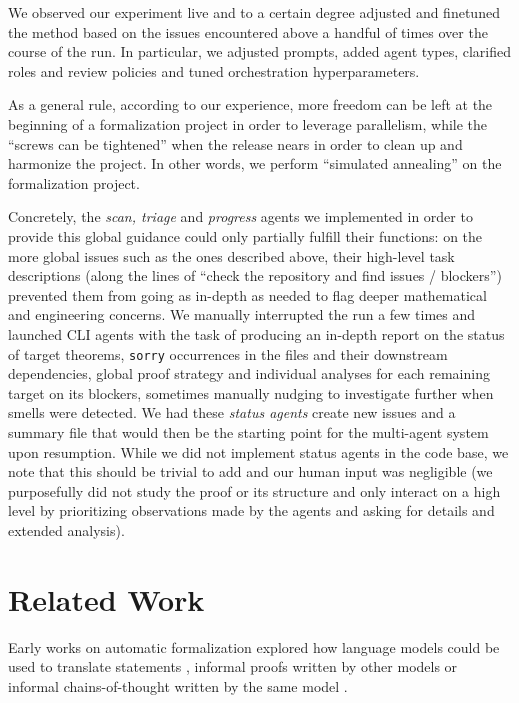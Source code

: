 \documentclass[]{fairmeta}
\begin{document}
We observed our experiment live and to a certain degree adjusted and finetuned the method based on the issues encountered above a handful of times over the course of the run. In particular, we adjusted prompts,  added agent types, clarified roles and review policies and tuned orchestration hyperparameters.

As a general rule, according to our experience, more freedom can be left at the beginning of a formalization project in order to leverage parallelism, while the ``screws can be tightened'' when the release nears in order to clean up and harmonize the project. In other words, we perform ``simulated annealing'' on the formalization project. 

Concretely, the \emph{scan, triage} and \emph{progress} agents we implemented in order to provide this global guidance could only partially fulfill their functions: on the more global issues such as the ones described above, their high-level task descriptions (along the lines of ``check the repository and find issues / blockers'') prevented them from going as in-depth as needed to flag deeper mathematical and engineering concerns. We manually interrupted the run a few times and launched CLI agents with the task of producing an in-depth report on the status of target theorems, \texttt{sorry} occurrences in the files and their downstream dependencies, global proof strategy and individual analyses for each remaining target on its blockers, sometimes manually nudging to investigate further when smells were detected. We had these \emph{status agents} create new issues and a summary file that would then be the starting point for the multi-agent system upon resumption. While we did not implement status agents in the code base, we note that this should be trivial to add and our human input was negligible (we purposefully did not study the proof or its structure and only interact on a high level by prioritizing observations made by the agents and asking for details and extended analysis).

\section{Related Work}

Early works on automatic formalization explored how language models could be used to translate statements \citep{wu2022autoformalization,wang2025aria}, informal proofs written by other models \citep{jiang2022draft} or informal chains-of-thought written by the same model \citep{xin2024deepseek,wang2025kiminaproverpreviewlargeformal}. 
\end{document}
